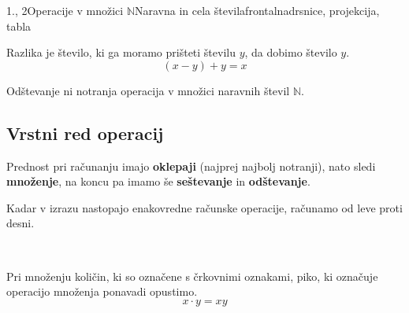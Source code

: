 \begin{priprava}{1., 2}{}{Operacije v množici $\mathbb{N}$}{Naravna in cela števila}{frontalna}{drsnice, projekcija, tabla}
\begin{figure}[H]
   \end{figure}


     
       Razlika je število, ki ga moramo prišteti številu $y$, da dobimo število $y$.
       $$ (x-y)+y=x $$


       Odštevanje ni notranja operacija v množici naravnih števil $\mathbb{N}$.
    

    \subsection{Vrstni red operacij}
       Prednost pri računanju imajo \textbf{oklepaji} (najprej najbolj notranji), nato sledi \textbf{množenje},
       na koncu pa imamo še \textbf{seštevanje} in \textbf{odštevanje}.
    

     
       Kadar v izrazu nastopajo enakovredne računske operacije, računamo od leve proti desni.
    

       ~\newline

       Pri množenju količin, ki so označene s črkovnimi oznakami, piko, ki označuje operacijo množenja ponavadi opustimo.
       $$ x\cdot y = xy$$
    




\end{priprava}